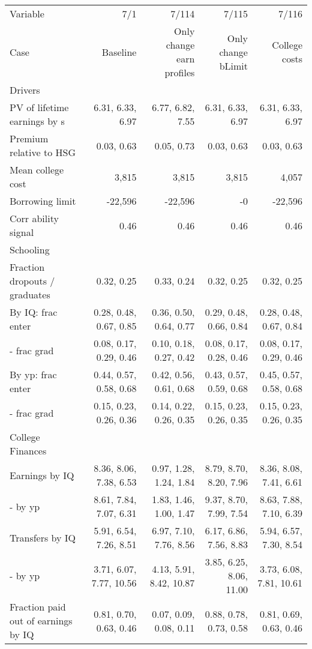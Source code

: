 \begin{tabular}{lrrrr}
\hline
Variable & 7/1  & 7/114  & 7/115  & 7/116  \\
Case & Baseline  & Only change earn profiles  & Only change bLimit  & College costs  \\
Drivers &   &   &   &   \\
PV of lifetime earnings by s & 6.31, 6.33, 6.97  & 6.77, 6.82, 7.55  & 6.31, 6.33, 6.97  & 6.31, 6.33, 6.97  \\
Premium relative to HSG & 0.03, 0.63  & 0.05, 0.73  & 0.03, 0.63  & 0.03, 0.63  \\
Mean college cost & 3,815  & 3,815  & 3,815  & 4,057  \\
Borrowing limit & -22,596  & -22,596  & -0  & -22,596  \\
Corr ability signal & 0.46  & 0.46  & 0.46  & 0.46  \\
\hline
Schooling &   &   &   &   \\
Fraction dropouts / graduates & 0.32, 0.25  & 0.33, 0.24  & 0.32, 0.25  & 0.32, 0.25  \\
By IQ: frac enter & 0.28, 0.48, 0.67, 0.85  & 0.36, 0.50, 0.64, 0.77  & 0.29, 0.48, 0.66, 0.84  & 0.28, 0.48, 0.67, 0.84  \\
- frac grad & 0.08, 0.17, 0.29, 0.46  & 0.10, 0.18, 0.27, 0.42  & 0.08, 0.17, 0.28, 0.46  & 0.08, 0.17, 0.29, 0.46  \\
By yp: frac enter & 0.44, 0.57, 0.58, 0.68  & 0.42, 0.56, 0.61, 0.68  & 0.43, 0.57, 0.59, 0.68  & 0.45, 0.57, 0.58, 0.68  \\
- frac grad & 0.15, 0.23, 0.26, 0.36  & 0.14, 0.22, 0.26, 0.35  & 0.15, 0.23, 0.26, 0.35  & 0.15, 0.23, 0.26, 0.35  \\
\hline
College Finances &   &   &   &   \\
Earnings by IQ & 8.36, 8.06, 7.38, 6.53  & 0.97, 1.28, 1.24, 1.84  & 8.79, 8.70, 8.20, 7.96  & 8.36, 8.08, 7.41, 6.61  \\
- by yp & 8.61, 7.84, 7.07, 6.31  & 1.83, 1.46, 1.00, 1.47  & 9.37, 8.70, 7.99, 7.54  & 8.63, 7.88, 7.10, 6.39  \\
Transfers by IQ & 5.91, 6.54, 7.26, 8.51  & 6.97, 7.10, 7.76, 8.56  & 6.17, 6.86, 7.56, 8.83  & 5.94, 6.57, 7.30, 8.54  \\
- by yp & 3.71, 6.07, 7.77, 10.56  & 4.13, 5.91, 8.42, 10.87  & 3.85, 6.25, 8.06, 11.00  & 3.73, 6.08, 7.81, 10.61  \\
Fraction paid out of earnings by IQ & 0.81, 0.70, 0.63, 0.46  & 0.07, 0.09, 0.08, 0.11  & 0.88, 0.78, 0.73, 0.58  & 0.81, 0.69, 0.63, 0.46  \\

\end{tabular}
